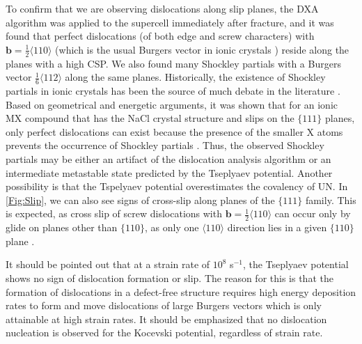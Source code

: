 \documentclass[applsci,article,submit,pdftex,moreauthors]{Definitions/mdpi}
\newcommand{\?}{\stackrel{?}{=}}
\begin{document}
To confirm that we are observing dislocations along slip planes, the DXA algorithm was applied to the supercell immediately after fracture, and it was found that perfect dislocations (of both edge and screw characters) with $\mathbf{b} = \frac{1}{2} \langle 110 \rangle$ (which is the usual Burgers vector in ionic crystals \cite{Hull2011}) reside along the planes with a high CSP. We also found many Shockley partials with a Burgers vector $\frac{1}{6}\langle112\rangle$ along the same planes. Historically, the existence of Shockley partials in ionic crystals has been the source of much debate in the literature \cite{Smoluchowski1966, Haasen1985}. Based on geometrical and energetic arguments, it was shown that for an ionic MX compound that has the NaCl crystal structure and slips on the $\{111\}$ planes, only perfect dislocations can exist because the presence of the smaller X atoms prevents the occurrence of Shockley partials \cite{VanDerWalt1967}. Thus, the observed Shockley partials may be either an artifact of the dislocation analysis algorithm or an intermediate metastable state predicted by the Tseplyaev potential. Another possibility is that the Tspelyaev potential overestimates the covalency of UN. In \cref{Fig:Slip}, we can also see signs of cross-slip along planes of the $\{111\}$ family. This is expected, as cross slip of screw dislocations with $\mathbf{b} = \frac{1}{2}\langle110\rangle$ can occur only by glide on planes other than $\{110\}$, as only one $\langle110\rangle$ direction lies in a given $\{110\}$ plane \cite{Hull2011}.

It should be pointed out that at a strain rate of $10^{8}$ s$^{-1}$, the Tseplyaev potential shows no sign of dislocation formation or slip. The reason for this is that the formation of dislocations in a defect-free structure requires high energy deposition rates to form and move dislocations of large Burgers vectors \cite{Desai2008, Pal2020} which is only attainable at high strain rates. It should be emphasized that no dislocation nucleation is observed for the Kocevski potential, regardless of strain rate.
\end{document}
